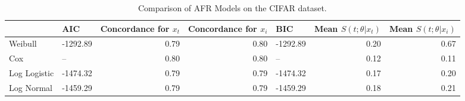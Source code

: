 \begin{table}
\caption{Comparison of AFR Models on the CIFAR dataset.}
\label{tab:cifar}
\begin{tabular}{llrrlrr}
\toprule
 & AIC & Concordance for $x_t$ & Concordance for $x_i$ & BIC & Mean $S(t;\theta|x_{t})$ & Mean $S(t;\theta|x_{i})$ \\
\midrule
Weibull & -1292.89 & 0.79 & 0.80 & -1292.89 & 0.20 & 0.67 \\
Cox & -- & 0.80 & 0.80 & -- & 0.12 & 0.11 \\
Log Logistic & -1474.32 & 0.79 & 0.79 & -1474.32 & 0.17 & 0.20 \\
Log Normal & -1459.29 & 0.79 & 0.79 & -1459.29 & 0.18 & 0.21 \\
\bottomrule
\end{tabular}
\end{table}
